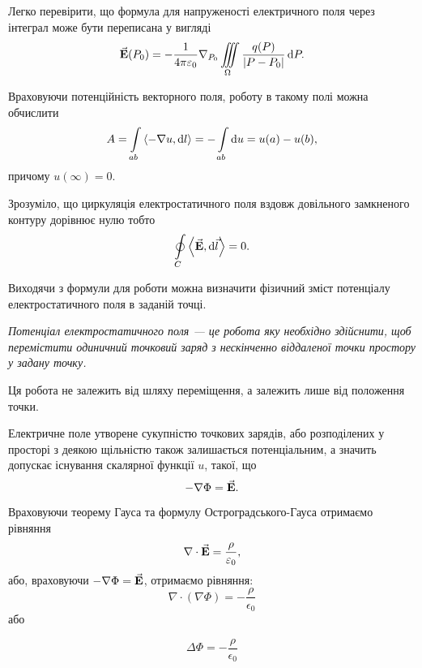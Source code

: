 Легко перевірити, що формула для напруженості електричного поля через інтеграл може бути переписана у вигляді
\begin{equation}
	{\vec{\mathbf{E}}} (P_0) = - \frac{1}{4 \pi \varepsilon_0} \nabla_{P_0} \displaystyle\iiint\limits_\Omega \frac{q(P)}{|P-P_0|} \mathop{}\!\mathrm{d} P.
\end{equation}

Враховуючи потенційність векторного поля, роботу в такому полі можна обчислити
\begin{equation}
	A = \Int_{ab} \langle - \nabla u, \diff l \rangle = - \Int_{ab} \diff u = u(a) - u(b),
\end{equation}
причому $u(\infty) = 0$. \medskip

\begin{remark}
	Зрозуміло, що циркуляція електростатичного поля вздовж довільного замкненого контуру дорівнює нулю тобто
	\begin{equation}
		\Oint_C \langle \vecf E, \diff \vec l \rangle = 0.
	\end{equation}
\end{remark}

Виходячи з формули для роботи можна визначити фізичний зміст потенціалу електростатичного поля в заданій точці. 

\begin{definition}
	\it{Потенціал електростатичного поля} --- це робота яку необхідно здійснити, щоб перемістити одиничний точковий заряд з нескінченно віддаленої точки простору у задану точку.
\end{definition}

\begin{remark}
	Ця робота не залежить від шляху переміщення, а залежить лише від положення точки.
\end{remark}
	 
Електричне поле утворене сукупністю точкових зарядів, або розподілених у просторі з деякою щільністю також залишається потенціальним, а значить допускає існування скалярної функції $u$, такої, що
\begin{equation}
	-\nabla \Phi = {\vec{\mathbf{E}}}.
\end{equation}

Враховуючи теорему Гауса та формулу Остроградського-Гауса отримаємо рівняння
\begin{equation}
	\nabla \cdot {\vec{\mathbf{E}}} = \frac{\rho}{\varepsilon_0},
\end{equation}
або, враховуючи $-\nabla \Phi = {\vec{\mathbf{E}}}$, отримаємо рівняння:
\begin{equation}
	\nabla \cdot (\nabla \Phi) = -\frac{\rho}{\epsilon_0}
\end{equation}
або
\begin{th_equation}
	\begin{equation}
		\Delta \Phi = - \frac{\rho}{\epsilon_0}
	\end{equation}
\end{th_equation}


